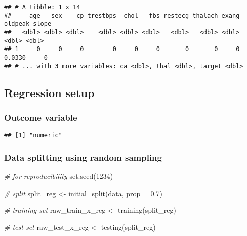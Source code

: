\documentclass[
]{book}
\newenvironment{Shaded}{\begin{snugshade}}{\end{snugshade}}
\newcommand{\AttributeTok}[1]{\textcolor[rgb]{0.77,0.63,0.00}{#1}}
\newcommand{\CommentTok}[1]{\textcolor[rgb]{0.56,0.35,0.01}{\textit{#1}}}
\newcommand{\DecValTok}[1]{\textcolor[rgb]{0.00,0.00,0.81}{#1}}
\newcommand{\FloatTok}[1]{\textcolor[rgb]{0.00,0.00,0.81}{#1}}
\newcommand{\FunctionTok}[1]{\textcolor[rgb]{0.00,0.00,0.00}{#1}}
\newcommand{\NormalTok}[1]{#1}
\newcommand{\OtherTok}[1]{\textcolor[rgb]{0.56,0.35,0.01}{#1}}
\newcommand{\SpecialCharTok}[1]{\textcolor[rgb]{0.00,0.00,0.00}{#1}}
\begin{document}
\begin{verbatim}
## # A tibble: 1 x 14
##     age   sex    cp trestbps  chol   fbs restecg thalach exang oldpeak slope
##   <dbl> <dbl> <dbl>    <dbl> <dbl> <dbl>   <dbl>   <dbl> <dbl>   <dbl> <dbl>
## 1     0     0     0        0     0     0       0       0     0  0.0330     0
## # ... with 3 more variables: ca <dbl>, thal <dbl>, target <dbl>
\end{verbatim}

\hypertarget{regression-setup}{%
\subsection{Regression setup}\label{regression-setup}}

\hypertarget{outcome-variable}{%
\subsubsection{Outcome variable}\label{outcome-variable}}

\begin{Shaded}
\end{Shaded}

\begin{verbatim}
## [1] "numeric"
\end{verbatim}

\hypertarget{data-splitting-using-random-sampling}{%
\subsubsection{Data splitting using random sampling}\label{data-splitting-using-random-sampling}}

\begin{Shaded}
\begin{Highlighting}[]
\CommentTok{\# for reproducibility}
\FunctionTok{set.seed}\NormalTok{(}\DecValTok{1234}\NormalTok{)}

\CommentTok{\# split}
\NormalTok{split\_reg }\OtherTok{\textless{}{-}} \FunctionTok{initial\_split}\NormalTok{(data, }\AttributeTok{prop =} \FloatTok{0.7}\NormalTok{)}

\CommentTok{\# training set}
\NormalTok{raw\_train\_x\_reg }\OtherTok{\textless{}{-}} \FunctionTok{training}\NormalTok{(split\_reg)}

\CommentTok{\# test set}
\NormalTok{raw\_test\_x\_reg }\OtherTok{\textless{}{-}} \FunctionTok{testing}\NormalTok{(split\_reg)}
\end{Highlighting}
\end{Shaded}
\end{document}
